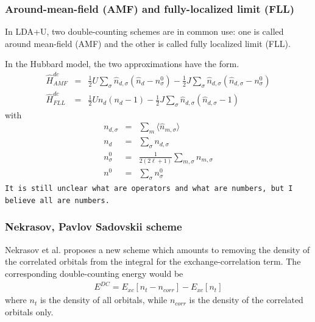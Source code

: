 \documentclass[11pt,a4paper]{report}
\begin{document}
\subsubsection{Around-mean-field (AMF) and fully-localized limit (FLL)}
In LDA+U, two double-counting schemes are in common use: one is called
around mean-field (AMF)\cite{anisimov91_prb44_943} and the other is
called fully localized limit (FLL)\cite{czyzyk94_prb49_14211}.

In the Hubbard model, the two approximations have the
form\cite{nekrasov12_arxiv1208_4732}. 
\begin{eqnarray}
\hat{H}^{dc}_{AMF}&=&\frac{1}{2}U\sum_\sigma\hat{n}_{d,\sigma}(\hat{n}_d-n_\sigma^0)
-\frac{1}{2}J\sum_\sigma\hat{n}_{d,\sigma}(\hat{n}_{d,\sigma}-n_\sigma^0)
\nonumber\\
\hat{H}^{dc}_{FLL}&=&\frac{1}{2}Un_d(n_d-1)
-\frac{1}{2}J\sum_\sigma\hat{n}_{d,\sigma}(\hat{n}_{d,\sigma}-1)
\end{eqnarray}
with
\begin{eqnarray}
n_{d,\sigma}&=&\sum_m \langle \hat{n}_{m,\sigma}\rangle
\nonumber\\
n_{d}&=&\sum_\sigma n_{d,\sigma}
\nonumber\\
n^0_\sigma&=&\frac{1}{2(2\ell+1)}\sum_{m,\sigma} n_{m,\sigma}
\nonumber\\
n^0&=&\sum_\sigma n^0_\sigma
\end{eqnarray}
\texttt{It is still unclear what are operators and what are numbers,
  but I believe all are numbers.}

\subsubsection{Nekrasov, Pavlov Sadovskii scheme}
Nekrasov et al.\cite{nekrasov12_arxiv1208_4732} proposes a new scheme
which amounts to removing the density of the correlated orbitals from
the integral for the exchange-correlation term.  The corresponding
double-counting energy would be
\begin{eqnarray}
E^{DC}=E_{xc}[n_t-n_{corr}]-E_{xc}[n_t]
\end{eqnarray}
where $n_t$ is the density of all orbitals, while $n_{corr}$ is the
density of the correlated orbitals only.
\end{document}
